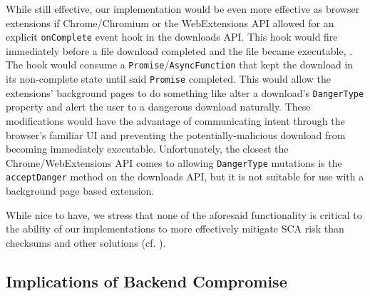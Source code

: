 While still effective, our implementation would be even more effective as
browser extensions if Chrome/Chromium or the WebExtensions API allowed for an
explicit \texttt{onComplete} event hook in the downloads API. This hook would
fire immediately before a file download completed and the file became
executable, . The hook would consume a \texttt{Promise}/\texttt{AsyncFunction} that
kept the download in its non-complete state until said \texttt{Promise}
completed. This would allow the extensions' background pages to do something
like alter a download's \texttt{DangerType} property and alert the user to a
dangerous download naturally. These modifications would have the advantage of
communicating intent through the browser's familiar UI and preventing the
potentially-malicious download from becoming immediately executable.
Unfortunately, the closest the Chrome/WebExtensions API comes to allowing
\texttt{DangerType} mutations is the \texttt{acceptDanger} method on the
downloads API, but it is not suitable for use with a background page based
extension.

While nice to have, we stress that none of the aforesaid functionality is
critical to the ability of our implementations to more effectively mitigate SCA
risk than checksums and other solutions (cf. ).







\subsection{Implications of Backend Compromise}

